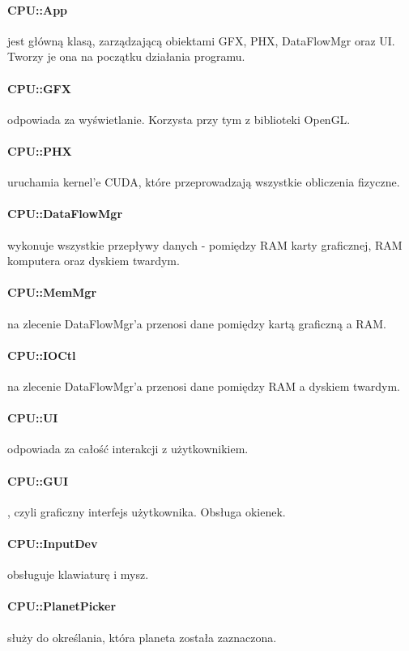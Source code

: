 \paragraph{CPU::App} jest główną klasą, zarządzającą obiektami GFX, PHX, DataFlowMgr oraz UI. Tworzy je ona na początku działania programu.
\paragraph{CPU::GFX} odpowiada za wyświetlanie. Korzysta przy tym z biblioteki OpenGL.
\paragraph{CPU::PHX} uruchamia kernel'e CUDA, które przeprowadzają wszystkie obliczenia fizyczne.
\paragraph{CPU::DataFlowMgr} wykonuje wszystkie przepływy danych - pomiędzy RAM karty graficznej, RAM komputera oraz dyskiem twardym.
\paragraph{CPU::MemMgr} na zlecenie DataFlowMgr'a przenosi dane pomiędzy kartą graficzną a RAM.
\paragraph{CPU::IOCtl} na zlecenie DataFlowMgr'a przenosi dane pomiędzy RAM a dyskiem twardym.
\paragraph{CPU::UI} odpowiada za całość interakcji z użytkownikiem.
\paragraph{CPU::GUI}, czyli graficzny interfejs użytkownika. Obsługa okienek.
\paragraph{CPU::InputDev} obsługuje klawiaturę i mysz.
\paragraph{CPU::PlanetPicker} służy do określania, która planeta została zaznaczona.
